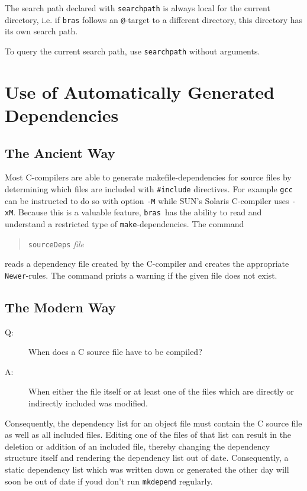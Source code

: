 \documentclass[12pt]{article}
\newcommand{\bras}{\texttt{bras}}
\newcommand{\make}{\texttt{make}}
\begin{document}
The search path declared with \texttt{searchpath} is always local for
the current directory, i.e. if \bras{} follows an \texttt{@}-target to
a different directory, this directory has its own search path.

To query the current search path, use \texttt{searchpath} without
arguments. 

\section{Use of Automatically Generated Dependencies}

\subsection{The Ancient Way}
Most C-compilers are able to generate makefile-dependencies for
source files by determining which files are included with
\texttt{\#include} directives. For example \texttt{gcc} can be
instructed to do so with option \texttt{-M} while SUN's Solaris
C-compiler uses \texttt{-xM}. Because this is a valuable feature,
\bras\ has the ability to read and understand a restricted type of
\make-dependencies. The command
\begin{quote}
  \texttt{sourceDeps} \textit{file}
\end{quote}
reads a dependency file created by the C-compiler and creates the
appropriate \texttt{Newer}-rules. The command prints a warning if
the given file does not exist.

\subsection{The Modern Way}
\label{secDepGen}
\begin{description}
\item[Q:] When does a C source file have to be compiled?
\item[A:] When either the file itself or at least one of the
  files which are directly or indirectly included was modified.
\end{description}
Consequently, the dependency list for an object file must contain the
C source file as well as all included files. Editing one of the files
of that list can result in the deletion or addition of an included
file, thereby changing the dependency structure itself and rendering
the dependency list out of date. Consequently, a static dependency
list which was written down or generated the other day will soon be
out of date if youd don't run \texttt{mkdepend} regularly. 
\end{document}
